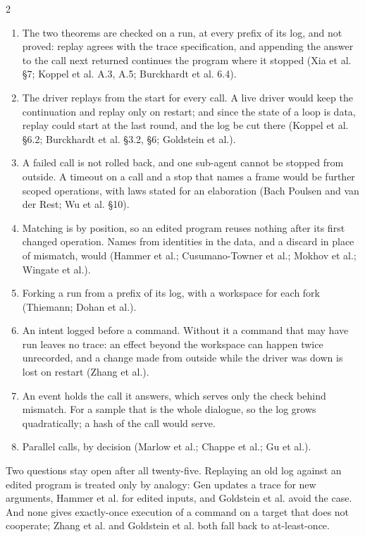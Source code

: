 \documentclass{article}
\newcommand{\topic}[1]{\par\medskip{\bfseries\normalsize #1}\par\smallskip}
\newcommand{\cd}[1]{{\ttfamily #1}}
\begin{document}
\begin{multicols}{2}
\topic{What it leaves}

\begin{enumerate}\setlength{\itemsep}{1pt}\setlength{\leftskip}{-0.6em}
\item The two theorems are checked on a run, at every prefix of its log, and not proved:
  \cd{replay} agrees with the trace specification, and appending the answer to the call \cd{next}
  returned continues the program where it stopped (Xia et al. \S7; Koppel et al. A.3, A.5;
  Burckhardt et al. 6.4).
\item The driver replays from the start for every call. A live driver would keep the continuation
  and replay only on restart; and since the state of a loop is data, replay could start at the
  last round, and the log be cut there (Koppel et al. \S6.2; Burckhardt et al. \S3.2, \S6;
  Goldstein et al.).
\item A failed call is not rolled back, and one sub-agent cannot be stopped from outside. A
  timeout on a call and a stop that names a frame would be further scoped operations, with laws
  stated for an elaboration (Bach Poulsen and van der Rest; Wu et al. \S10).
\item Matching is by position, so an edited program reuses nothing after its first changed
  operation. Names from identities in the data, and a discard in place of \cd{mismatch}, would
  (Hammer et al.; Cusumano-Towner et al.; Mokhov et al.; Wingate et al.).
\item Forking a run from a prefix of its log, with a workspace for each fork (Thiemann; Dohan et
  al.).
\item An intent logged before a command. Without it a command that may have run leaves no
  trace: an effect beyond the workspace can happen twice unrecorded, and a change made from
  outside while the driver was down is lost on restart (Zhang et al.).
\item An event holds the call it answers, which serves only the check behind \cd{mismatch}. For
  a \cd{sample} that is the whole dialogue, so the log grows quadratically; a hash of the call
  would serve.
\item Parallel calls, by decision (Marlow et al.; Chappe et al.; Gu et al.).
\end{enumerate}
Two questions stay open after all twenty-five. Replaying an old log against an edited program is
treated only by analogy: Gen updates a trace for new arguments, Hammer et al. for edited inputs,
and Goldstein et al. avoid the case. And none gives exactly-once execution of a command on a
target that does not cooperate; Zhang et al. and Goldstein et al. both fall back to
at-least-once.


\end{multicols}
\end{document}
